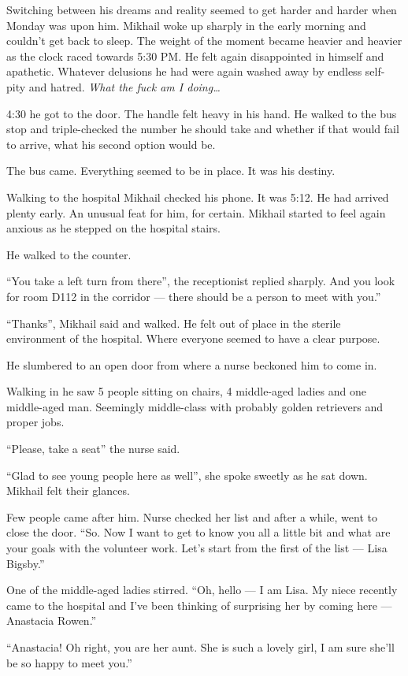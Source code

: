 Switching between his dreams and reality seemed to get harder and harder when Monday was upon him. Mikhail woke up sharply in the early morning and couldn’t get back to sleep. The weight of the moment became heavier and heavier as the clock raced towards 5:30 PM. He felt again disappointed in himself and apathetic. Whatever delusions he had were again washed away by endless self-pity and hatred. \textit{What the fuck am I doing…}

4:30 he got to the door. The handle felt heavy in his hand. He walked to the bus stop and triple-checked the number he should take and whether if that would fail to arrive, what his second option would be.

The bus came. Everything seemed to be in place. It was his destiny.

Walking to the hospital Mikhail checked his phone. It was 5:12. He had arrived plenty early. An unusual feat for him, for certain. Mikhail started to feel again anxious as he stepped on the hospital stairs. 

He walked to the counter.

“You take a left turn from there”, the receptionist replied sharply. And you look for room D112 in the corridor — there should be a person to meet with you.”

“Thanks”, Mikhail said and walked. He felt out of place in the sterile environment of the hospital. Where everyone seemed to have a clear purpose.

He slumbered to an open door from where a nurse beckoned him to come in.

Walking in he saw 5 people sitting on chairs, 4 middle-aged ladies and one middle-aged man. Seemingly middle-class with probably golden retrievers and proper jobs.

“Please, take a seat” the nurse said.

“Glad to see young people here as well”, she spoke sweetly as he sat down. Mikhail felt their glances.

Few people came after him. Nurse checked her list and after a while, went to close the door. “So. Now I want to get to know you all a little bit and what are your goals with the volunteer work. Let’s start from the first of the list — Lisa Bigsby.”

One of the middle-aged ladies stirred. “Oh, hello — I am Lisa. My niece recently came to the hospital and I’ve been thinking of surprising her by coming here — Anastacia Rowen.”

“Anastacia! Oh right, you are her aunt. She is such a lovely girl, I am sure she’ll be so happy to meet you.”

